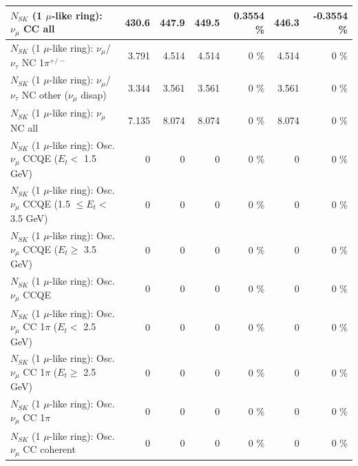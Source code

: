 \begin{table}
\begin{tabular}{| l | r | r | r  r | r  r |}
                                $N_{SK}$ (1 $\mu$-like ring): $\nu_{\mu}$ CC all &           430.6 &           447.9 &           449.5 &   0.3554 \%  &           446.3 &  -0.3554 \%  \\ 
\hline
              $N_{SK}$ (1 $\mu$-like ring): $\nu_\mu$/$\nu_\tau$ NC 1$\pi^{+/-}$ &           3.791 &           4.514 &           4.514 &        0 \%  &           4.514 &        0 \%  \\ 
   $N_{SK}$ (1 $\mu$-like ring): $\nu_\mu$/$\nu_\tau$ NC other ($\nu_\mu$ disap) &           3.344 &           3.561 &           3.561 &        0 \%  &           3.561 &        0 \%  \\ 
                                $N_{SK}$ (1 $\mu$-like ring): $\nu_{\mu}$ NC all &           7.135 &           8.074 &           8.074 &        0 \%  &           8.074 &        0 \%  \\ 
\hline
\hline
           $N_{SK}$ (1 $\mu$-like ring): Osc. $\nu_\mu$ CCQE ($E_{t} <$ 1.5 GeV) &               0 &               0 &               0 &        0 \%  &               0 &        0 \%  \\ 
  $N_{SK}$ (1 $\mu$-like ring): Osc. $\nu_\mu$ CCQE (1.5 $\leq E_{t} <$ 3.5 GeV) &               0 &               0 &               0 &        0 \%  &               0 &        0 \%  \\ 
        $N_{SK}$ (1 $\mu$-like ring): Osc. $\nu_\mu$ CCQE ($E_{t} \geq$ 3.5 GeV) &               0 &               0 &               0 &        0 \%  &               0 &        0 \%  \\ 
\hline
                               $N_{SK}$ (1 $\mu$-like ring): Osc. $\nu_\mu$ CCQE &               0 &               0 &               0 &        0 \%  &               0 &        0 \%  \\ 
\hline
      $N_{SK}$ (1 $\mu$-like ring): Osc. $\nu_\mu$ CC 1$\pi$ ($E_{t} <$ 2.5 GeV) &               0 &               0 &               0 &        0 \%  &               0 &        0 \%  \\ 
   $N_{SK}$ (1 $\mu$-like ring): Osc. $\nu_\mu$ CC 1$\pi$ ($E_{t} \geq$ 2.5 GeV) &               0 &               0 &               0 &        0 \%  &               0 &        0 \%  \\ 
\hline
                          $N_{SK}$ (1 $\mu$-like ring): Osc. $\nu_\mu$ CC 1$\pi$ &               0 &               0 &               0 &        0 \%  &               0 &        0 \%  \\ 
                        $N_{SK}$ (1 $\mu$-like ring): Osc. $\nu_\mu$ CC coherent &               0 &               0 &               0 &        0 \%  &               0 &        0 \%  \\ 

\end{tabular}
\end{table}

